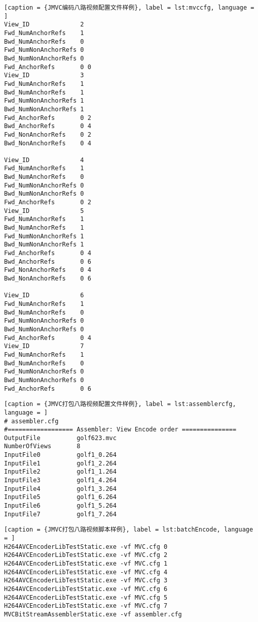 \begin{lstlisting}[caption = {JMVC编码八路视频配置文件样例}, label = lst:mvccfg, language = ]
View_ID              2
Fwd_NumAnchorRefs    1
Bwd_NumAnchorRefs    0
Fwd_NumNonAnchorRefs 0
Bwd_NumNonAnchorRefs 0
Fwd_AnchorRefs       0 0
View_ID              3
Fwd_NumAnchorRefs    1
Bwd_NumAnchorRefs    1
Fwd_NumNonAnchorRefs 1
Bwd_NumNonAnchorRefs 1
Fwd_AnchorRefs       0 2
Bwd_AnchorRefs       0 4
Fwd_NonAnchorRefs    0 2
Bwd_NonAnchorRefs    0 4

View_ID              4
Fwd_NumAnchorRefs    1
Bwd_NumAnchorRefs    0
Fwd_NumNonAnchorRefs 0
Bwd_NumNonAnchorRefs 0
Fwd_AnchorRefs       0 2
View_ID              5
Fwd_NumAnchorRefs    1
Bwd_NumAnchorRefs    1
Fwd_NumNonAnchorRefs 1
Bwd_NumNonAnchorRefs 1
Fwd_AnchorRefs       0 4
Bwd_AnchorRefs       0 6
Fwd_NonAnchorRefs    0 4
Bwd_NonAnchorRefs    0 6

View_ID              6
Fwd_NumAnchorRefs    1
Bwd_NumAnchorRefs    0
Fwd_NumNonAnchorRefs 0
Bwd_NumNonAnchorRefs 0
Fwd_AnchorRefs       0 4
View_ID              7
Fwd_NumAnchorRefs    1
Bwd_NumAnchorRefs    0
Fwd_NumNonAnchorRefs 0
Bwd_NumNonAnchorRefs 0
Fwd_AnchorRefs       0 6
\end{lstlisting}

\begin{lstlisting}[caption = {JMVC打包八路视频配置文件样例}, label = lst:assemblercfg, language = ]
# assembler.cfg
#================== Assembler: View Encode order ===============
OutputFile          golf623.mvc
NumberOfViews       8
InputFile0          golf1_0.264
InputFile1          golf1_2.264
InputFile2          golf1_1.264
InputFile3          golf1_4.264
InputFile4          golf1_3.264
InputFile5          golf1_6.264
InputFile6          golf1_5.264
InputFile7          golf1_7.264
\end{lstlisting}

\begin{lstlisting}[caption = {JMVC打包八路视频脚本样例}, label = lst:batchEncode, language = ]
H264AVCEncoderLibTestStatic.exe -vf MVC.cfg 0
H264AVCEncoderLibTestStatic.exe -vf MVC.cfg 2
H264AVCEncoderLibTestStatic.exe -vf MVC.cfg 1
H264AVCEncoderLibTestStatic.exe -vf MVC.cfg 4
H264AVCEncoderLibTestStatic.exe -vf MVC.cfg 3
H264AVCEncoderLibTestStatic.exe -vf MVC.cfg 6
H264AVCEncoderLibTestStatic.exe -vf MVC.cfg 5
H264AVCEncoderLibTestStatic.exe -vf MVC.cfg 7
MVCBitStreamAssemblerStatic.exe -vf assembler.cfg
\end{lstlisting}